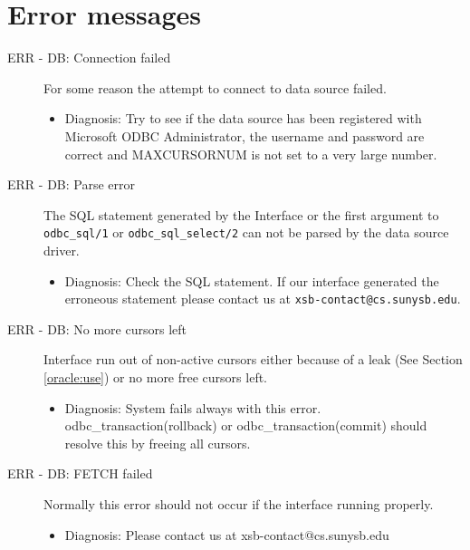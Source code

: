 \section{Error messages}
\begin{description}
\item[ERR - DB: Connection failed] For some reason the attempt to connect
        to data source failed.
        \begin{itemize}
        \item   Diagnosis: Try to see if the data source has been registered 
                                  with Microsoft ODBC Administrator, the username and 
                                  password are correct and MAXCURSORNUM is not set 
                                  to a very large number.
        \end{itemize}

\item[ERR - DB: Parse error] The SQL statement generated by the
                          Interface or the first argument to {\tt odbc\_sql/1} or 
                       {\tt odbc\_sql\_select/2} can not be parsed by the data 
                              source driver.
        \begin{itemize}
        \item   Diagnosis: Check the SQL statement.  If our interface
                generated the erroneous statement please contact us at
                {\tt xsb-contact@cs.sunysb.edu}.
        \end{itemize}

\item[ERR - DB: No more cursors left] Interface run out of non-active
cursors either because of a leak (See Section \ref{oracle:use}) or no
more free cursors left. 
\begin{itemize}

\item Diagnosis: System fails always with this error.  odbc\_transaction(rollback) or
           odbc\_transaction(commit) should resolve this by freeing all cursors.
\end{itemize}

\item[ERR - DB: FETCH failed] Normally this error should not occur if the 
interface running properly.
\begin{itemize}

\item Diagnosis: Please contact us at xsb-contact@cs.sunysb.edu
\end{itemize}

\end{description}

